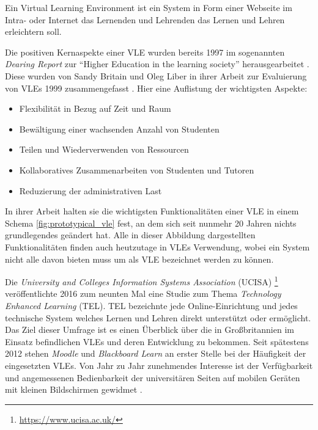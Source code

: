\documentclass[11pt,a4paper,twoside,ngerman]{article}
\begin{document}
\noindent
Ein Virtual Learning Environment ist ein System in Form einer Webseite im Intra- oder Internet das Lernenden und Lehrenden das Lernen und Lehren erleichtern soll.

Die positiven Kernaspekte einer VLE wurden bereits 1997 im sogenannten \textit{Dearing Report} zur "`Higher Education in the learning society"' herausgearbeitet \cite{dearing1997}.
Diese wurden von Sandy Britain und Oleg Liber in ihrer Arbeit zur Evaluierung von VLEs 1999 zusammengefasst \cite{jtap-vle}. Hier eine Auflistung der wichtigsten Aspekte:

\begin{itemize}
    \item Flexibilität in Bezug auf Zeit und Raum
    \item Bewältigung einer wachsenden Anzahl von Studenten
    \item Teilen und Wiederverwenden von Ressourcen
    \item Kollaboratives Zusammenarbeiten von Studenten und Tutoren
    \item Reduzierung der administrativen Last
\end{itemize}

\noindent
In ihrer Arbeit halten sie die wichtigsten Funktionalitäten einer VLE in einem Schema \autoref{fig:prototypical_vle} fest, an dem sich seit nunmehr 20 Jahren nichts grundlegendes geändert hat. Alle in dieser Abbildung dargestellten Funktionalitäten finden auch heutzutage in VLEs Verwendung, wobei ein System nicht alle davon bieten muss um als VLE bezeichnet werden zu können. \cite{jtap-vle}

Die \textit{University and Colleges Information Systems Association} (UCISA) \footnote{\url{https://www.ucisa.ac.uk/}} veröffentlichte 2016 zum neunten Mal eine Studie zum Thema \textit{Technology Enhanced Learning} (TEL). TEL bezeichnte jede Online-Einrichtung und jedes technische System welches Lernen und Lehren direkt unterstützt oder ermöglicht. Das Ziel dieser Umfrage ist es einen Überblick über die in Großbritannien im Einsatz befindlichen VLEs und deren Entwicklung zu bekommen. Seit spätestens 2012 stehen \textit{Moodle} und \textit{Blackboard Learn} an erster Stelle bei der Häufigkeit der eingesetzten VLEs. Von Jahr zu Jahr zunehmendes Interesse ist der Verfügbarkeit und angemessenen Bedienbarkeit der universitären Seiten auf mobilen Geräten mit kleinen Bildschirmen gewidmet \cite{ucisa-tel16}\cite{web:ucisatel}.
\end{document}
